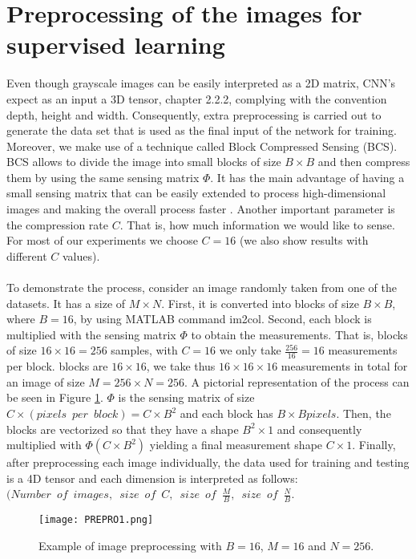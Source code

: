 \section{Preprocessing of the images for supervised learning} \label{sec:prepro}
Even though grayscale images can be easily interpreted as a 2D matrix, CNN's expect as an input a 3D tensor, chapter 2.2.2, complying with the convention depth, height and width. Consequently, extra preprocessing is carried out to generate the data set that is used as the final input of the network for training. Moreover, we make use of a technique called Block Compressed Sensing (BCS). BCS allows to divide the image into small blocks of size $B \times B$ and then compress them by using the same sensing matrix $\Phi$. It has the main advantage of having a small sensing matrix that can be easily extended to process high-dimensional images and making the overall process faster \cite{gan2007block, fowler2012block}. Another important parameter is the compression rate $C$. That is, how much information we would like to sense. For most of our experiments we choose $C=16$ (we also show results with different $C$ values).           \
\\\\
To demonstrate the process, consider an image randomly taken from one of the datasets. It has a size of $M \times N$. First, it is converted into  blocks of size $B \times B$, where $B=16$, by using MATLAB command im2col. Second, each block is multiplied with the sensing matrix $\Phi$ to obtain the measurements. That is, blocks of size $16 \times 16  = 256$ samples, with $C=16$ we only take $ \frac{256}{16}=16$ measurements per block. blocks are $16 \times 16 $, we take thus $16 \times 16 \times 16$ measurements in total for an image of size $M=256 \times N=256$. A pictorial representation of the process can be seen in Figure \ref{fig:PREPROim1}. $\Phi$ is the sensing matrix of size $C \times  ( pixels \enspace per \enspace block) = C \times B^2$ and each block has $B \times B pixels$. Then, the blocks are vectorized so that they have a shape $B^2 \times 1$ and consequently multiplied with $\Phi ( C \times B^2 )$ yielding a final measurement shape $C \times 1 $. Finally, after preprocessing each image individually, the data used for training and testing is a 4D tensor and each dimension is interpreted as follows: $(Number \enspace of \enspace images, \enspace size \enspace of \enspace C ,\enspace size \enspace of \enspace \frac{M}{B} , \enspace size \enspace of \enspace \frac{N}{B}$.  
\begin{figure}[!htb] 
\centering 
\texttt{[image: PREPRO1.png]} 
\caption[Preprocessing of images]{Example of image preprocessing  with $B=16$, $M=16$ and $N=256$.}
\label{fig:PREPROim1} 
\end{figure}

